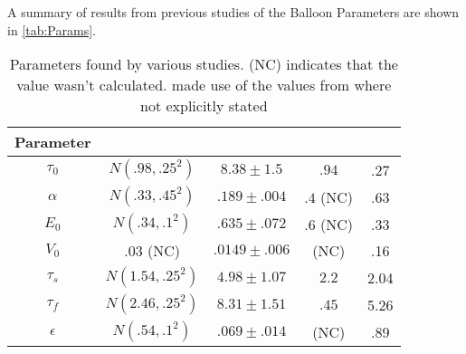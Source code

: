 A summary of results from previous studies of the Balloon Parameters
are shown in \autoref{tab:Params}.


\begin{table}[t]
\centering
\begin{tabular}{|c || c | c | c | c|}
\hline 
Parameter  & \cite{Friston2000} & \cite{Johnston2008} & \cite{Vakorin2007} & \cite{Deneux2006}\\
\hline
$\tau_0  $ &  $N(.98 , .25^2)$  & $8.38 \pm 1.5  $ & $.94$ & .27\\
$\alpha  $ &  $N(.33 , .45^2)$  & $.189 \pm .004 $ & $.4$ (NC) & .63 \\
$E_0     $ &  $N(.34 , .1 ^2)$  & $.635 \pm .072 $ & $.6$ (NC) & .33\\
$V_0     $ &  $.03$ (NC)        & $.0149 \pm .006$ & (NC) & .16\\
$\tau_s  $ &  $N(1.54, .25^2)$  & $4.98 \pm 1.07 $ & $2.2$ & 2.04 \\
$\tau_f  $ &  $N(2.46, .25^2)$  & $8.31 \pm 1.51 $ & $.45$ & 5.26\\
$\epsilon$ &  $N(.54 , .1 ^2)$  & $.069 \pm .014 $ & (NC) & .89\\
\hline
\end{tabular}
\caption{Parameters found by various studies. (NC) indicates that the value
wasn't calculated. \cite{Vakorin2007} made use of the values from \cite{Friston2002}
where not explicitly stated}
\label{tab:Params} 
\end{table}

